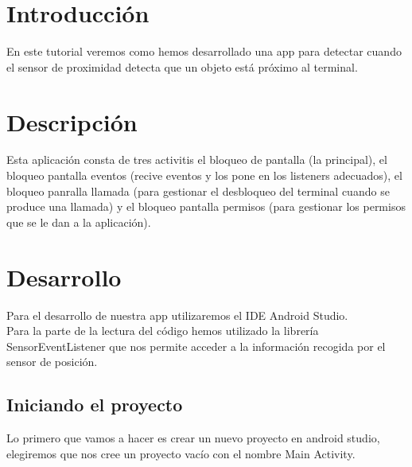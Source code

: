 \newpage %

\tableofcontents %

\listoffigures

\newpage


\section{Introducción}
En este tutorial veremos como hemos desarrollado una app para detectar cuando el sensor de proximidad detecta que un objeto está próximo al terminal.


\section{Descripción}
Esta aplicación consta de tres activitis el bloqueo de pantalla (la principal), el bloqueo pantalla eventos (recive eventos y los pone en los listeners adecuados), el bloqueo panralla llamada (para gestionar el desbloqueo del terminal cuando se produce una llamada) y el bloqueo pantalla permisos (para gestionar los permisos que se le dan a la aplicación).

\section{Desarrollo}
Para el desarrollo de nuestra app utilizaremos el IDE Android Studio.\\

Para la parte de la lectura del código hemos utilizado la librería SensorEventListener que nos permite acceder a la información recogida por el sensor de posición.\\

\subsection{Iniciando el proyecto}
Lo primero que vamos a hacer es crear un nuevo proyecto en android studio, elegiremos que nos cree un proyecto vacío con el nombre Main Activity.


